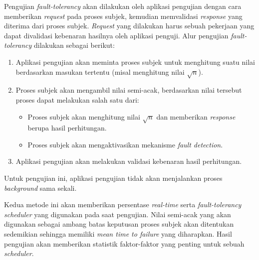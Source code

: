 Pengujian \textit{fault-tolerancy} akan dilakukan oleh aplikasi pengujian dengan cara memberikan \textit{request} pada proses subjek, kemudian memvalidasi \textit{response} yang diterima dari proses subjek.
\textit{Request} yang dilakukan harus sebuah pekerjaan yang dapat divalidasi kebenaran hasilnya oleh aplikasi penguji.
Alur pengujian \textit{fault-tolerancy} dilakukan sebagai berikut:
\begin{enumerate}
    \item Aplikasi pengujian akan meminta proses subjek untuk menghitung suatu nilai berdasarkan masukan tertentu (misal menghitung nilai $\sqrt{n}$).
    \item Proses subjek akan mengambil nilai semi-acak, berdasarkan nilai tersebut proses dapat melakukan salah satu dari:
        \begin{itemize}
            \item Proses subjek akan menghitung nilai $\sqrt{n}$ dan memberikan \textit{response} berupa hasil perhitungan.
            \item Proses subjek akan mengaktivasikan mekanisme \textit{fault detection}.
        \end{itemize}
    \item Aplikasi pengujian akan melakukan validasi kebenaran hasil perhitungan.
\end{enumerate}
Untuk pengujian ini, aplikasi pengujian tidak akan menjalankan proses \textit{background} sama sekali.

Kedua metode ini akan memberikan persentase \textit{real-time} serta \textit{fault-tolerancy} \textit{scheduler} yang digunakan pada saat pengujian.
Nilai semi-acak yang akan digunakan sebagai ambang batas keputusan proses subjek akan ditentukan sedemikian sehingga memiliki \textit{mean time to failure} yang diharapkan.
Hasil pengujian akan memberikan statistik faktor-faktor yang penting untuk sebuah \textit{scheduler}.

